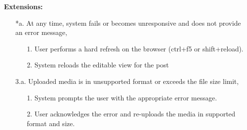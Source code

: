\documentclass{article}
\begin{document}
    \textbf{Extensions:}
    \begin{enumerate}
        \item[*a.]At any time, system fails or becomes unresponsive and does not provide an error message,
        \begin{enumerate}
            \item[1.] User performs a hard refresh on the browser (ctrl+f5 or shift+reload).
            \item[2.] System reloads the editable view for the post  
        \end{enumerate}
        \item [3.a.]  Uploaded media is in unsupported format or exceeds the file size limit,
        \begin{enumerate}
            \item[1.] System prompts the user with the appropriate error message.
            \item[2.]User acknowledges the error and re-uploads the media in supported format and size.
        \end{enumerate}
    \end{enumerate}
\end{document}
